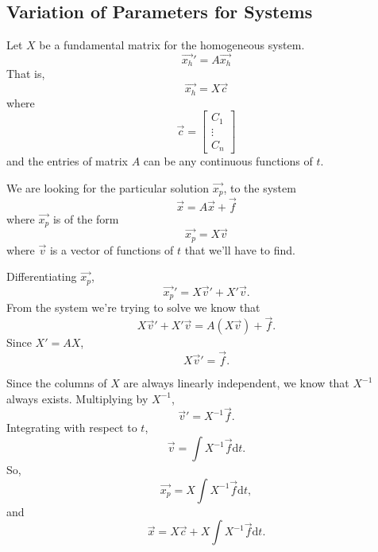 \subsection{Variation of Parameters for Systems}
\noindent
Let $X$ be a fundamental matrix for the homogeneous system.
\begin{equation*}
	\vec{x_h}' = A\vec{x_h}
\end{equation*}
That is,
\begin{equation*}
	\vec{x_h} = X\vec{c}
\end{equation*}
where
\begin{equation*}
	\vec{c} = \begin{bmatrix}
	C_1 \\
	\vdots \\
	C_n
	\end{bmatrix}
\end{equation*}
and the entries of matrix $A$ can be any continuous functions of $t$.

\noindent
We are looking for the particular solution $\vec{x_p}$, to the system
\begin{equation*}
	\vec{x} = A\vec{x} + \vec{f}
\end{equation*}
where $\vec{x_p}$ is of the form
\begin{equation*}
	\vec{x_p} = X\vec{v}
\end{equation*}
where $\vec{v}$ is a vector of functions of $t$ that we'll have to find.

\noindent
Differentiating $\vec{x_p}$,
\begin{equation*}
	\vec{x_p}' = X\vec{v}' + X'\vec{v}.
\end{equation*}
From the system we're trying to solve we know that
\begin{equation*}
	X\vec{v}' + X'\vec{v} = A(X\vec{v}) + \vec{f}.
\end{equation*}
Since $X' = AX$,
\begin{equation*}
	X\vec{v}' = \vec{f}.
\end{equation*}

\noindent
Since the columns of $X$ are always linearly independent, we know that $X^{-1}$ always exists.
Multiplying by $X^{-1}$,
\begin{equation*}
	\vec{v}' = X^{-1}\vec{f}.
\end{equation*}
Integrating with respect to $t$,
\begin{equation*}
	\vec{v} = \int{X^{-1}\vec{f} \mathrm{d}t}.
\end{equation*}
So,
\begin{equation*}
	\vec{x_p} = X\int{X^{-1}\vec{f} \mathrm{d}t},
\end{equation*}
and
\begin{equation*}
	\vec{x} = X\vec{c} + X\int{X^{-1}\vec{f} \mathrm{d}t}.
\end{equation*}

